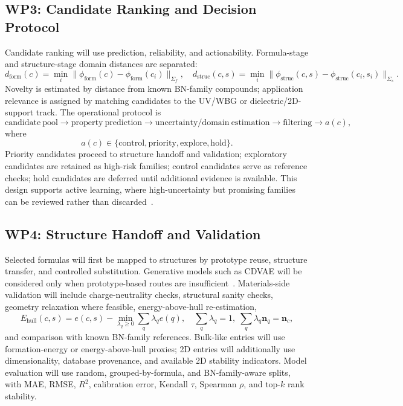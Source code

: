 \documentclass[10pt,a4paper]{article}
\newcommand{\ehull}{E_{\mathrm{hull}}}
\newcommand{\domainf}{d_{\mathrm{form}}}
\newcommand{\domains}{d_{\mathrm{struc}}}
\begin{document}
\subsection{WP3: Candidate Ranking and Decision Protocol}
Candidate ranking will use prediction, reliability, and actionability. Formula-stage and structure-stage domain distances are separated:
\[
  \domainf(c)=\min_i\|\phi_{\mathrm{form}}(c)-\phi_{\mathrm{form}}(c_i)\|_{\Sigma_f},
  \quad
  \domains(c,s)=\min_i\|\phi_{\mathrm{struc}}(c,s)-\phi_{\mathrm{struc}}(c_i,s_i)\|_{\Sigma_s}.
\]
Novelty is estimated by distance from known BN-family compounds; application relevance is assigned by matching candidates to the UV/WBG or dielectric/2D-support track. The operational protocol is
\[
  \mathrm{candidate\ pool}\rightarrow\mathrm{property\ prediction}\rightarrow
  \mathrm{uncertainty/domain\ estimation}\rightarrow\mathrm{filtering}\rightarrow
  a(c),
\]
where
\[
  a(c)\in\{\mathrm{control},\mathrm{priority},\mathrm{explore},\mathrm{hold}\}.
\]
Priority candidates proceed to structure handoff and validation; exploratory candidates are retained as high-risk families; control candidates serve as reference checks; hold candidates are deferred until additional evidence is available. This design supports active learning, where high-uncertainty but promising families can be reviewed rather than discarded~\cite{lookman2019_active}.

\subsection{WP4: Structure Handoff and Validation}
Selected formulas will first be mapped to structures by prototype reuse, structure transfer, and controlled substitution. Generative models such as CDVAE will be considered only when prototype-based routes are insufficient~\cite{xie2022_cdvae}. Materials-side validation will include charge-neutrality checks, structural sanity checks, geometry relaxation where feasible, energy-above-hull re-estimation,
\[
  \ehull(c,s)=e(c,s)-
  \min_{\lambda_q\ge0}\sum_q\lambda_q e(q),
  \quad \sum_q\lambda_q=1,\;\sum_q\lambda_q\mathbf{n}_q=\mathbf{n}_c,
\]
and comparison with known BN-family references. Bulk-like entries will use formation-energy or energy-above-hull proxies; 2D entries will additionally use dimensionality, database provenance, and available 2D stability indicators. Model evaluation will use random, grouped-by-formula, and BN-family-aware splits, with MAE, RMSE, $R^2$, calibration error, Kendall $\tau$, Spearman $\rho$, and top-$k$ rank stability.
\end{document}
